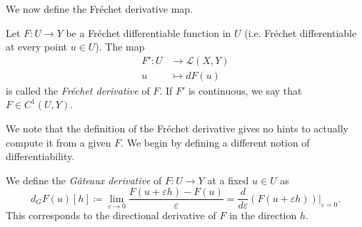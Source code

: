 We now define the Fréchet derivative map.
\begin{definition}
    Let $F:U\to Y$ be a Fréchet differentiable function in $U$ (i.e. Fréchet differentiable at every point $u\in U$). The map
    \begin{equation}
        \begin{aligned}
            F':U &\to \mathcal{L}(X,Y)\\
            u &\mapsto dF(u)
        \end{aligned}
    \end{equation}
    is called the \emph{Fréchet derivative} of $F$. If $F'$ is continuous, we say that $F\in C^1(U,Y)$.
\end{definition}

We note that the definition of the Fréchet derivative gives no hints to actually compute it from a given $F$. We begin by defining a different notion of differentiability.
\begin{definition}
    We define the \emph{Gâteaux derivative} of $F:U\to Y$ at a fixed $u\in U$ as
    \begin{equation}\label{eq:gateaux-derivative}
        d_G F(u)[h] \coloneqq \lim_{\varepsilon\to 0} \frac{F(u+\varepsilon h)-F(u)}{\varepsilon} = \frac{d}{d\varepsilon}\left.\left(F(u+\varepsilon h)\right)\right|_{\varepsilon = 0}.
    \end{equation}
    This corresponds to the directional derivative of $F$ in the direction $h$.
\end{definition}

